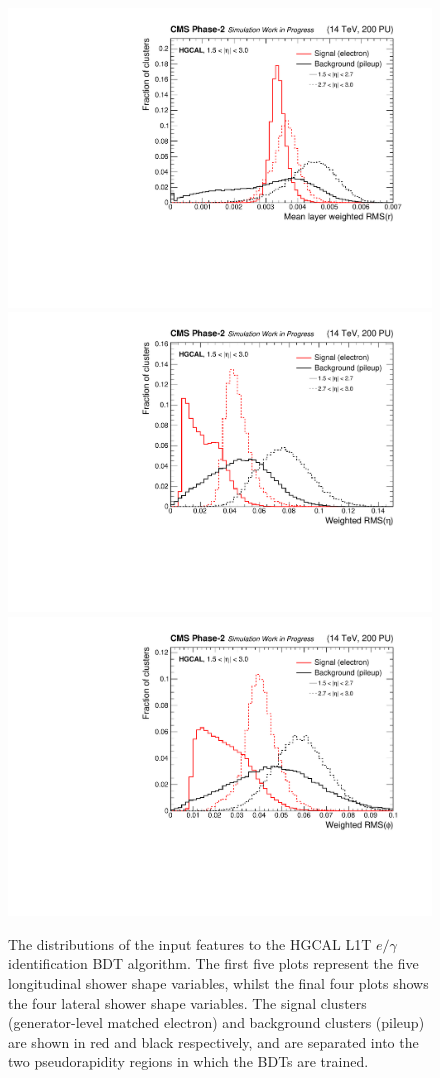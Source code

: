 \begin{figure}[htb!]
  \includegraphics[width=.32\textwidth]{Figures/cms/egid/cl3d_srrmean.pdf}
  \includegraphics[width=.32\textwidth]{Figures/cms/egid/cl3d_seetot.pdf}
  \includegraphics[width=.32\textwidth]{Figures/cms/egid/cl3d_spptot.pdf}
  \caption[$e/\gamma$ identification input feature distributions]
  {
    The distributions of the input features to the HGCAL L1T $e/\gamma$ identification BDT algorithm. The first five plots represent the five longitudinal shower shape variables, whilst the final four plots shows the four lateral shower shape variables. The signal clusters (generator-level matched electron) and background clusters (pileup) are shown in red and black respectively, and are separated into the two pseudorapidity regions in which the BDTs are trained.
  }
  \label{fig:egid_all_features}
\end{figure}